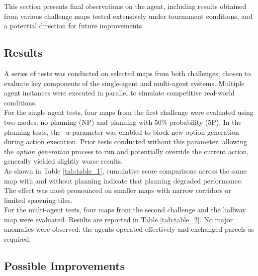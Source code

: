 
    This section presents final observations on the agent, including results obtained from various challenge maps tested extensively under tournament conditions, and a potential direction for future improvements.

    \subsection{Results}
        A series of tests was conducted on selected maps from both challenges, chosen to evaluate key components of the single-agent and multi-agent systems. Multiple agent instances were executed in parallel to simulate competitive real-world conditions.
        \medskip\\
        For the single-agent tests, four maps from the first challenge were evaluated using two modes: no planning (NP) and planning with 50\% probability (5P). In the planning tests, the \textit{-w} parameter was enabled to block new option generation during action execution. Prior tests conducted without this parameter, allowing the \textit{option generation} process to run and potentially override the current action, generally yielded slightly worse results.
        \medskip\\
        As shown in Table \ref{tab:table_1}, cumulative score comparisons across the same map with and without planning indicate that planning degraded performance. The effect was most pronounced on smaller maps with narrow corridors or limited spawning tiles.
        \medskip\\
        For the multi-agent tests, four maps from the second challenge and the hallway map were evaluated. Results are reported in Table \ref{tab:table_2}. No major anomalies were observed: the agents operated effectively and exchanged parcels as required.
    
    \subsection{Possible Improvements}


